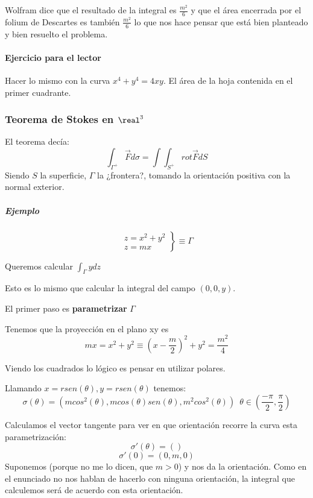 Wolfram dice que el resultado de la integral es $\frac{m^2}{6}$ y que el área encerrada por el folium de Descartes es también $\frac{m^2}{6}$ lo que nos hace pensar que está bien planteado y bien resuelto el problema.


\paragraph{Ejercicio para el lector} Hacer lo mismo con la curva $x^4+y^4=4xy$. El área de la hoja contenida en el primer cuadrante.

\subsubsection{Teorema de Stokes en $\real^3$}

El teorema decía: \[
\int_{\Gamma^+}\overrightarrow{F}d\sigma = \int \int_{S^+} rot\overrightarrow{F} dS
\]
Siendo $S$ la superficie, $\Gamma$ la ¿frontera?, tomando la orientación positiva con la normal exterior.

\subparagraph{Ejemplo}
\[
\left.\begin{array}{cc}
z=x^2+y^2\\
z=mx \end{array} \right\} \equiv \Gamma
\]

Queremos calcular $\displaystyle \int_{\Gamma}y dz$

Esto es lo mismo que calcular la integral del campo $(0,0,y)$.

El primer paso es \textbf{parametrizar} $\Gamma$

Tenemos que la proyección en el plano xy es \[mx=x^2+y^2 \equiv \left(x-\frac{m}{2}\right)^2 + y^2 = \frac{m^2}{4}\]

Viendo los cuadrados lo lógico es pensar en utilizar polares.

Llamando $x=rsen(\theta),y=rsen(\theta)$ tenemos:
\[\sigma(\theta) = \left(mcos^2(\theta),mcos(\theta)sen(\theta),m^2cos^2(\theta)\right)\,\,\,\theta\in\left(\frac{-\pi}{2},\frac{\pi}{2}\right)\]

Calculamos el vector tangente para ver en que orientación recorre la curva esta parametrización:
\[\sigma'(\theta) = ()\]
\[\sigma'(0) = (0,m,0)\]
Suponemos (porque no me lo dicen, que $m>0$) y nos da la orientación. Como en el enunciado no nos hablan de hacerlo con ninguna orientación, la integral que calculemos será de acuerdo con esta orientación.

